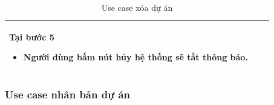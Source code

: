 \documentclass[12pt,a4paper]{article}
\begin{document}
\begin{table}[H]
\begin{tabular}{|p{3.5cm}|p{11.5cm}|c|}
            Tại bước 5\newline
            \vspace{-.8cm}\begin{itemize}
                              \item Người dùng bấm nút hủy hệ thống sẽ tắt thông báo.
            \end{itemize} \\
            \hline
        \end{tabular}
        \caption{Use case xóa dự án }

    \end{table}

    \subsubsection*{Use case nhân bản dự án }
\end{document}

